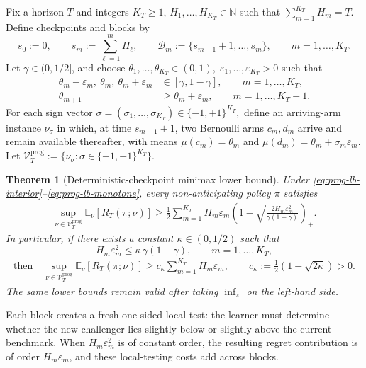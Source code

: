 \documentclass[11pt]{article}
\newtheorem{theorem}{Theorem}
\begin{document}
Fix a horizon $T$ and integers $K_T\ge1$, $H_1,\dots,H_{K_T}\in\mathbb N$ such that
\(
\sum_{m=1}^{K_T} H_m=T.
\)
Define checkpoints and blocks by
\[
s_0:=0,
\qquad
s_m:=\sum_{\ell=1}^m H_\ell,
\qquad
\mathcal B_m:=\{s_{m-1}+1,\dots,s_m\},
\qquad
m=1,\dots,K_T.
\]
Let $\gamma\in(0,1/2]$, and choose
\(
\theta_1,\dots,\theta_{K_T}\in(0,1),
\;
\varepsilon_1,\dots,\varepsilon_{K_T}>0
\) 
such that
\begin{align}
\theta_m-\varepsilon_m,\ \theta_m,\ \theta_m+\varepsilon_m
&\in[\gamma,1-\gamma],
\qquad m=1,\dots,K_T,
\label{eq:prog-lb-interior}
\\
\theta_{m+1}
&\ge \theta_m+\varepsilon_m,
\qquad m=1,\dots,K_T-1.
\label{eq:prog-lb-monotone}
\end{align}
For each sign vector
\(
\sigma=(\sigma_1,\dots,\sigma_{K_T})\in\{-1,+1\}^{K_T},
\)
define an arriving-arm instance $\nu_\sigma$ in which, at time $s_{m-1}+1$, two Bernoulli
arms $c_m,d_m$ arrive and remain available thereafter, with means
\(
\mu(c_m)=\theta_m\) and \(
\mu(d_m)=\theta_m+\sigma_m\varepsilon_m.
\)
Let
\(
\mathcal V_T^{\mathrm{prog}}
:=
\{\nu_\sigma:\sigma\in\{-1,+1\}^{K_T}\}.
\)

\begin{theorem}[Deterministic-checkpoint minimax lower bound]
\label{thm:prog-lb-general}
Under \eqref{eq:prog-lb-interior}--\eqref{eq:prog-lb-monotone}, every non-anticipating policy
$\pi$ satisfies
\begin{align}
\sup_{\nu\in\mathcal V_T^{\mathrm{prog}}}
\mathbb E_\nu[R_T(\pi;\nu)]
\ge
\frac12
\sum_{m=1}^{K_T}
H_m\varepsilon_m
\left(
1-
\sqrt{
\frac{2H_m\varepsilon_m^2}{\gamma(1-\gamma)}
}
\right)_+ .
    \label{eq:prog-lb-kl-simple}
\end{align}
In particular, if there exists a constant $\kappa\in(0,1/2)$ such that
\[
H_m\varepsilon_m^2
\le
\kappa\,\gamma(1-\gamma),
\qquad
m=1,\dots,K_T,
\]
\begin{align}
    \text{then}\quad \sup_{\nu\in\mathcal V_T^{\mathrm{prog}}}
\mathbb E_\nu[R_T(\pi;\nu)]
\ge
c_\kappa
\sum_{m=1}^{K_T} H_m\varepsilon_m,
\qquad
c_\kappa:=\frac12(1-\sqrt{2\kappa})>0.
\label{eq:prog-lb-clean}
\end{align}
The same lower bounds remain valid after taking $\inf_\pi$ on the left-hand side.
\end{theorem}

Each block creates a fresh one-sided local test: the learner must determine whether the new
challenger lies slightly below or slightly above the current benchmark. When
$H_m\varepsilon_m^2$ is of constant order, the resulting regret contribution is of order
$H_m\varepsilon_m$, and these local-testing costs add across blocks.
\end{document}
